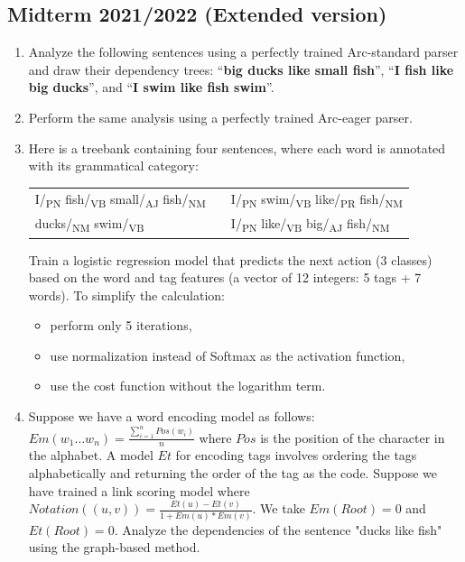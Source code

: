 \documentclass{../extra/aakpract/aakpract}
\begin{document}
	\subsection{Midterm 2021/2022 (Extended version)}
	
	\begin{enumerate}
		\item Analyze the following sentences using a perfectly trained Arc-standard parser and draw their dependency trees:
		``\textbf{big ducks like small fish}'', ``\textbf{I fish like big ducks}'', and ``\textbf{I swim like fish swim}''.
		\item Perform the same analysis using a perfectly trained Arc-eager parser.
		\item Here is a treebank containing four sentences, where each word is annotated with its grammatical category:
		\begin{center}
			\begin{tabular}{|lll|}
				\hline
				I/\textsubscript{PN} fish/\textsubscript{VB} small/\textsubscript{AJ} fish/\textsubscript{NM} &&
				I/\textsubscript{PN} swim/\textsubscript{VB} like/\textsubscript{PR} fish/\textsubscript{NM}\\
				ducks/\textsubscript{NM} swim/\textsubscript{VB} &&
				I/\textsubscript{PN} like/\textsubscript{VB} big/\textsubscript{AJ} fish/\textsubscript{NM} \\
				\hline
			\end{tabular}
		\end{center}
		
		Train a logistic regression model that predicts the next action (3 classes) based on the word and tag features (a vector of 12 integers: 5 tags + 7 words).
		To simplify the calculation: 
		\begin{itemize}
			\item perform only 5 iterations,
			\item use normalization instead of Softmax as the activation function,
			\item use the cost function without the logarithm term.
		\end{itemize}
		
		\item Suppose we have a word encoding model as follows: $Em(w_1\dots w_n) = \frac{\sum_{i=1}^{n} Pos(w_i)}{n}$ where $Pos$ is the position of the character in the alphabet. A model $Et$ for encoding tags involves ordering the tags alphabetically and returning the order of the tag as the code. Suppose we have trained a link scoring model where $Notation((u, v)) = \frac{Et(u) - Et(v)}{1+ Em(u)*Em(v)}$. We take $Em(Root) = 0$ and $Et(Root) = 0$. Analyze the dependencies of the sentence "ducks like fish" using the graph-based method.
		
	\end{enumerate}
	
\end{document}
